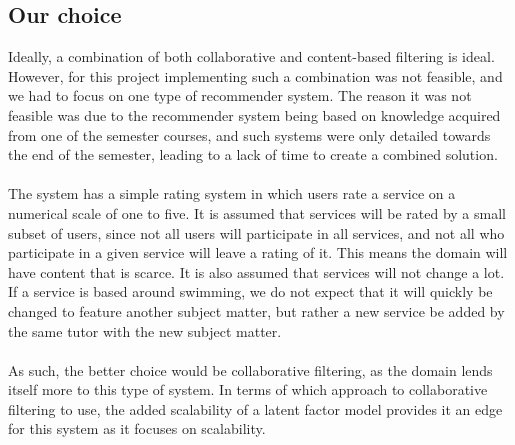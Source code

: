 \subsection{Our choice}\label{subsec:recommender-our-choice}
Ideally, a combination of both collaborative and content-based filtering is ideal.
However, for this project implementing such a combination was not feasible, and we had to focus on one type of recommender system.
The reason it was not feasible was due to the recommender system being based on knowledge acquired from one of the semester courses, and such systems were only detailed towards the end of the semester, leading to a lack of time to create a combined solution.
\\\\
The system has a simple rating system in which users rate a service on a numerical scale of one to five.
It is assumed that services will be rated by a small subset of users, since not all users will participate in all services, and not all who participate in a given service will leave a rating of it.
This means the domain will have content that is scarce.
It is also assumed that services will not change a lot.
If a service is based around swimming, we do not expect that it will quickly be changed to feature another subject matter, but rather a new service be added by the same tutor with the new subject matter.
\\\\
As such, the better choice would be collaborative filtering, as the domain lends itself more to this type of system.
In terms of which approach to collaborative filtering to use, the added scalability of a latent factor model provides it an edge for this system as it focuses on scalability.

